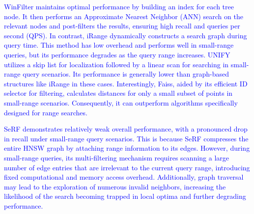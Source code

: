 \documentclass[sigconf, nonacm]{acmart}
\begin{document}
	\textcolor{blue}{
	WinFilter maintains optimal performance by building an index for each tree node. It then performs an Approximate Nearest Neighbor (ANN) search on the relevant nodes and post-filters the results, ensuring high recall and queries per second (QPS).
	In contrast, iRange dynamically constructs a search graph during query time. This method has low overhead and performs well in small-range queries, but its performance degrades as the query range increases.
	UNIFY utilizes a skip list for localization followed by a linear scan for searching in small-range query scenarios. Its performance is generally lower than graph-based structures like iRange in these cases.
	Interestingly, Faiss, aided by its efficient ID selector for filtering, calculates distances for only a small subset of points in small-range scenarios. Consequently, it can outperform algorithms specifically designed for range searches.
	}
%	
	

	\textcolor{blue}{SeRF demonstrates relatively weak overall performance, with a pronounced drop in recall under small-range query scenarios. This is because SeRF compresses the entire HNSW graph by attaching range information to its edges. However, during small-range queries, its multi-filtering mechanism requires scanning a large number of edge entries that are irrelevant to the current query range, introducing fixed computational and memory access overhead. Additionally, graph traversal may lead to the exploration of numerous invalid neighbors, increasing the likelihood of the search becoming trapped in local optima and further degrading performance.
	}
	
\end{document}
